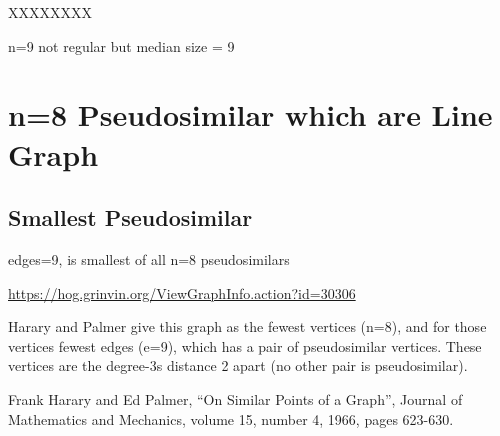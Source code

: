 \documentclass{article}
\begin{document}
XXXXXXXX

n=9 not regular but median size = 9

\begin{center}
\end{center}

\clearpage
\section{n=8 Pseudosimilar which are Line Graph}

\subsection{Smallest Pseudosimilar}

edges=9, is smallest of all n=8 pseudosimilars

\url{https://hog.grinvin.org/ViewGraphInfo.action?id=30306}

\smallskip

Harary and Palmer give this graph as the fewest vertices (n=8), and
for those vertices fewest edges (e=9), which has a pair of
pseudosimilar vertices.  These vertices are the degree-3s distance 2
apart (no other pair is pseudosimilar).

Frank Harary and Ed Palmer, ``On Similar Points of a Graph'', Journal of
Mathematics and Mechanics, volume 15, number 4, 1966, pages 623-630.
\end{document}
